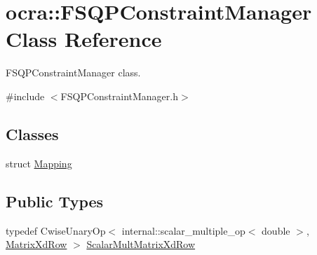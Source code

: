 \hypertarget{classocra_1_1FSQPConstraintManager}{}\section{ocra\+:\+:F\+S\+Q\+P\+Constraint\+Manager Class Reference}
\label{classocra_1_1FSQPConstraintManager}


F\+S\+Q\+P\+Constraint\+Manager class.  




{\ttfamily \#include $<$F\+S\+Q\+P\+Constraint\+Manager.\+h$>$}

\subsection*{Classes}
\begin{DoxyCompactItemize}
\item 
struct \hyperlink{structocra_1_1FSQPConstraintManager_1_1Mapping}{Mapping}
\end{DoxyCompactItemize}
\subsection*{Public Types}
\begin{DoxyCompactItemize}
\item 
typedef Cwise\+Unary\+Op$<$ internal\+::scalar\+\_\+multiple\+\_\+op$<$ double $>$, \hyperlink{namespaceocra_a608bf0522317ed1df3bbfc6a5753bc01}{Matrix\+Xd\+Row} $>$ \hyperlink{classocra_1_1FSQPConstraintManager_abe1cf7412d42b4a1b7158936a24ae6fb}{Scalar\+Mult\+Matrix\+Xd\+Row}
\end{DoxyCompactItemize}
